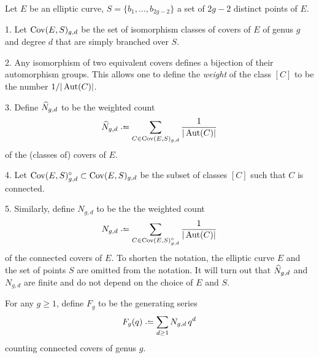 \begin{defi} Let $E$ be an elliptic curve, $S=\{b_1,\dotsc,b_{2g-2}\}$ a set of $2g-2$ distinct points of $E$.

  1. Let $\operatorname{Cov}(E,S)_{g,d}$ be the set of isomorphism classes of covers of $E$ of genus $g$ and degree $d$ that are simply branched over $S$.
  
  2. Any isomorphism of two equivalent covers defines a bijection of their automorphism groups. This allows one to define the \emph{weight} of the class $[C]$ to be the number $1/|\operatorname{Aut}(C)|$.
  
  3. Define $\widehat{N}_{g,d}$ to be the weighted count \[\what N_{g,d}\defeq\sum_{C\in \Cov(E,S)_{g,d}} \frac{1}{|\Aut(C)|}\] of the (classes of) covers of $E$.
  
  4. Let $\operatorname{Cov}(E,S)^{\circ}_{g,d}\subset\operatorname{Cov}(E,S)_{g,d}$ be the subset of classes $[C]$ such that $C$ is connected.
  
  5. Similarly, define $N_{g,d}$ to be the the weighted count \[N_{g,d}\defeq\sum_{C\in \Cov(E,S)^{\circ}_{g,d}} \frac{1}{\abs{\Aut(C)}}\] of the connected covers of $E$.
 To shorten the notation, the elliptic curve $E$ and the set of points $S$ are omitted from the notation. It will turn out that $\widehat{N}_{g,d}$ and $N_{g,d}$ are finite and do not depend on the choice of $E$ and $S$.
\end{defi}

\begin{defi}
 For any $g\geq 1$, define $F_g$ to be the generating series \[F_g(q)\defeq\sum_{d\geq 1}N_{g, d}\,q^d\] counting connected covers of genus $g$.
\end{defi}

